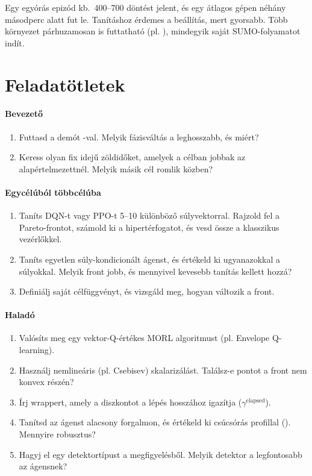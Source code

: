 \documentclass[11pt,a4paper]{article}
\begin{document}
Egy egyórás epizód kb.\ 400--700 döntést jelent, és egy átlagos gépen néhány másodperc alatt fut
le. Tanításhoz érdemes a  beállítás, mert gyorsabb. Több környezet
párhuzamosan is futtatható (pl. ), mindegyik saját SUMO-folyamatot indít.

\section{Feladatötletek}

\paragraph{Bevezető}
\begin{enumerate}
  \item Futtasd a demót -val. Melyik fázisváltás a leghosszabb, és miért?
  \item Keress olyan fix idejű zöldidőket, amelyek a  célban jobbak az alapértelmezettnél.
        Melyik másik cél romlik közben?
\end{enumerate}

\paragraph{Egycélúból többcélúba}
\begin{enumerate}[resume]
  \item Taníts DQN-t vagy PPO-t 5--10 különböző súlyvektorral. Rajzold fel a Pareto-frontot, számold
        ki a hipertérfogatot, és vesd össze a klasszikus vezérlőkkel.
  \item Taníts egyetlen súly-kondicionált ágenst, és értékeld ki ugyanazokkal a súlyokkal. Melyik
        front jobb, és mennyivel kevesebb tanítás kellett hozzá?
  \item Definiálj saját célfüggvényt, és vizsgáld meg, hogyan változik a front.
\end{enumerate}

\paragraph{Haladó}
\begin{enumerate}[resume]
  \item Valósíts meg egy vektor-Q-értékes MORL algoritmust (pl. Envelope Q-learning).
  \item Használj nemlineáris (pl. Csebisev) skalarizálást. Találsz-e pontot a front nem konvex részén?
  \item Írj wrappert, amely a diszkontot a lépés hosszához igazítja ($\gamma^{\text{elapsed}}$).
  \item Tanítsd az ágenst alacsony forgalmon, és értékeld ki csúcsórás profillal
        (). Mennyire robusztus?
  \item Hagyj el egy detektortípust a megfigyelésből. Melyik detektor a legfontosabb az ágensnek?
\end{enumerate}
\end{document}
